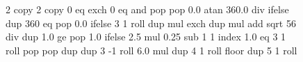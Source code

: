 \begin{figure}
%
%
  \centering
{}
{\pgfpoint{-2cm}{-2cm}}
{\pgfpoint{2cm}{2cm}}
{}
{ %
 2 copy %
 2 copy 0 eq exch 0 eq and
 { pop pop 0.0 } %
 {atan 360.0 div} %
 ifelse  %
 dup 360 eq { pop 0.0 }{} ifelse %
 3 1 roll %
 dup mul %
 exch dup mul %
 add sqrt %
 56 div %
 dup 1.0 ge %
 { pop 1.0 }{} ifelse %
 2.5 mul 0.25 sub %
 1 %
 1 index 1.0 eq %
 { %
   3 1 roll pop pop dup dup
 }
 { %
   3 -1 roll 6.0 mul dup 4 1 roll %
   floor %
   dup  5 1 roll %
}}
\end{figure}
